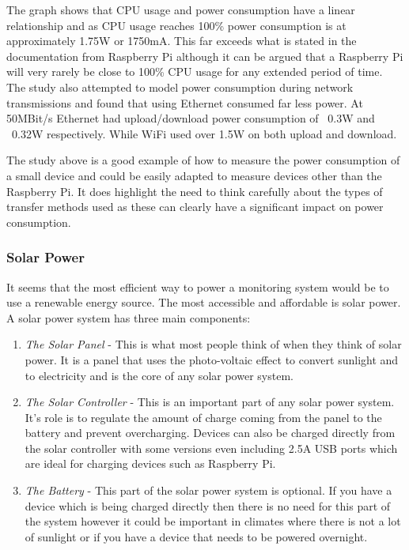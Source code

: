 \documentclass[10pt,a4paper]{article}
\begin{document}
The graph shows that CPU usage and power consumption have a linear relationship and as CPU usage reaches 100\% power consumption is at approximately 1.75W or 1750mA. This far exceeds what is stated in the documentation from Raspberry Pi although it can be argued that a Raspberry Pi will very rarely be close to 100\% CPU usage for any extended period of time. The study also attempted to model power consumption during network transmissions and found that using Ethernet consumed far less power. At 50MBit/s Ethernet had upload/download power consumption of ~0.3W and ~0.32W respectively. While WiFi used over 1.5W on both upload and download. 

The study above is a good example of how to measure the power consumption of a small device and could be easily adapted to measure devices other than the Raspberry Pi. It does highlight the need to think carefully about the types of transfer methods used as these can clearly have a significant impact on power consumption.
\subsubsection{Solar Power}
It seems that the most efficient way to power a monitoring system would be to use a renewable energy source. The most accessible and affordable is solar power. A solar power system has three main components: 
\begin{enumerate}
\item\textit{The Solar Panel} - This is what most people think of when they think of solar power. It is a panel that uses the photo-voltaic effect to convert sunlight and to electricity and is the core of any solar power system.
\item\textit{The Solar Controller} - This is an important part of any solar power system. It's role is to regulate the amount of charge coming from the panel to the battery and prevent overcharging\cite{website:energymatters}. Devices can also be charged directly from the solar controller with some versions even including 2.5A USB ports which are ideal for charging devices such as Raspberry Pi.
\item\textit{The Battery} - This part of the solar power system is optional. If you have a device which is being charged directly then there is no need for this part of the system however it could be important in climates where there is not a lot of sunlight or if you have a device that needs to be powered overnight.
\end{enumerate}
\end{document}
